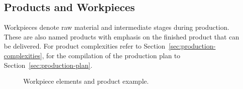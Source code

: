 \documentclass[12pt,twoside]{article}
\newcommand{\refsec}[1]{Section~\ref{#1}}
\begin{document}
\subsection{Products and Workpieces}
\label{sec:products}
Workpieces denote raw material and intermediate stages during
production. These are also named products with emphasis on the
finished product that can be delivered. For product complexities refer
to \refsec{sec:production-complexities}, for the compilation of the
production plan to \refsec{sec:production-plan}.

\begin{figure}[h]
  \centering
  \quad
  \quad
  \caption{Workpiece elements and product example.}
  \label{fig:workpieces}
\end{figure}
\end{document}
